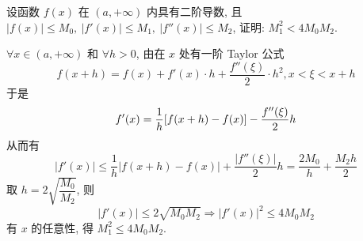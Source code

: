 \begin{example}
    设函数 $f(x)$ 在 $(a,+\infty)$ 内具有二阶导数, 且 $|f(x)|\leqslant M_0,~|f'(x)|\leqslant M_1,~|f''(x)|\leqslant M_2$, 证明: $M_1^2< 4M_0M_2.$
\end{example}
\begin{solution}
    $\forall x\in(a,+\infty)$ 和 $\forall h>0$, 由在 $x$ 处有一阶 Taylor 公式 $$f(x+h)=f(x)+f'(x)\cdot h+\dfrac{f''(\xi)}{2}\cdot h^2,x<\xi<x+h$$
    于是 $$f'(x)=\dfrac{1}{h}\qty[f(x+h)-f(x)]-\dfrac{f''(\xi)}{2}h$$ 从而有 $$|f'(x)|\leqslant \dfrac{1}{h}|f(x+h)-f(x)|+\dfrac{|f''(\xi)|}{2}h=\dfrac{2M_0}{h}+\dfrac{M_2h}{2}$$
    取 $h=2\sqrt{\dfrac{M_0}{M_2}}$, 则 $$|f'(x)|\leqslant 2\sqrt{M_0M_2}\Rightarrow |f'(x)|^2\leqslant 4M_0M_2$$ 有 $x$ 的任意性, 得 $M_1^2\leqslant 4M_0M_2.$
\end{solution}

